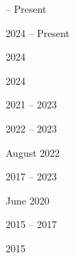 \documentclass[cv.tex]{subfiles}
\begin{document}
\parbox{0.18\textwidth}{%
	 -- Present \par
	2024 -- Present \par
	2024 \par
	2024 \par
	\null \par
	2021 -- 2023 \par
	2022 -- 2023 \par
	\null \par
	\null \par
	\null \par
	August 2022 \par
	\null \par
	2017 -- 2023 \par
	June 2020 \par
	\null \par
	\null \par
	2015 -- 2017 \par
	\null \par
	2015 \par
	\null \par
}
\hspace{1mm}
\end{document}
